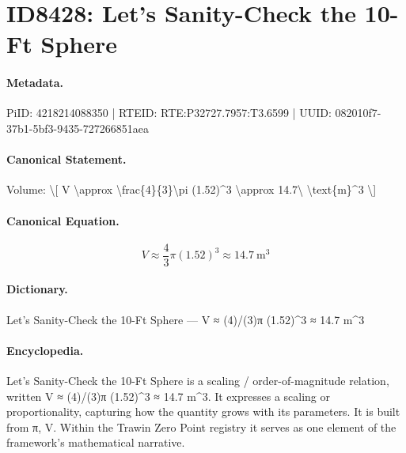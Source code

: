 \section*{ID8428: Let’s Sanity-Check the 10-Ft Sphere}
\paragraph{Metadata.}
PiID: 4218214088350 | RTEID: RTE:P32727.7957:T3.6599 | UUID: 082010f7-37b1-5bf3-9435-727266851aea

\paragraph{Canonical Statement.}
Volume: \textbackslash{}[ V \textbackslash{}approx \textbackslash{}frac\{4\}\{3\}\textbackslash{}pi (1.52)\textasciicircum{}3 \textbackslash{}approx 14.7\textbackslash{} \textbackslash{}text\{m\}\textasciicircum{}3 \textbackslash{}]

\paragraph{Canonical Equation.}
\[
V \approx \frac{4}{3}\pi (1.52)^3 \approx 14.7\ \text{m}^3
\]

\paragraph{Dictionary.}
Let’s Sanity-Check the 10-Ft Sphere — V ≈ (4)/(3)π (1.52)\textasciicircum{}3 ≈ 14.7 m\textasciicircum{}3

\paragraph{Encyclopedia.}
Let’s Sanity-Check the 10-Ft Sphere is a scaling / order-of-magnitude relation, written V ≈ (4)/(3)π (1.52)\textasciicircum{}3 ≈ 14.7 m\textasciicircum{}3. It expresses a scaling or proportionality, capturing how the quantity grows with its parameters. It is built from π, V. Within the Trawin Zero Point registry it serves as one element of the framework's mathematical narrative.

